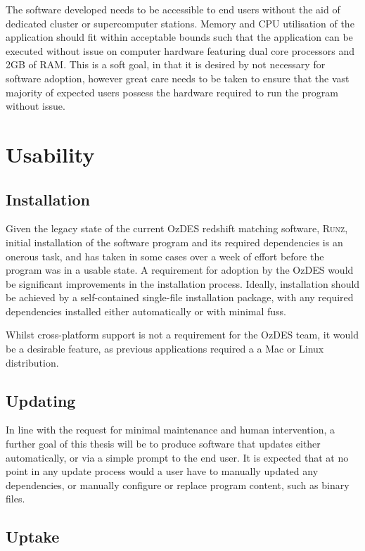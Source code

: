 \documentclass[titlesmallcaps, examinerscopy, copyrightpage]{uqthesis}
\begin{document}
The software developed needs to be accessible to end users without the aid of dedicated cluster or supercomputer stations. Memory and CPU utilisation of the application should fit within acceptable bounds such that the application can be executed without issue on computer hardware featuring dual core processors and 2GB of RAM. This is a soft goal, in that it is desired by not necessary for software adoption, however great care needs to be taken to ensure that the vast majority of expected users possess the hardware required to run the program without issue.

\section{Usability}

\subsection{Installation}

Given the legacy state of the current OzDES redshift matching software, \textsc{Runz}, initial installation of the software program and its required dependencies is an onerous task, and has taken in some cases over a week of effort before the program was in a usable state. A requirement for adoption by the OzDES would be significant improvements in the installation process. Ideally, installation should be achieved by a self-contained  single-file installation package, with any required dependencies installed either automatically or with minimal fuss.

Whilst cross-platform support is not a requirement for the OzDES team, it would be a desirable feature, as previous applications required a a Mac or Linux distribution.

\subsection{Updating}

In line with the request for minimal maintenance and human intervention, a further goal of this thesis will be to produce software that updates either automatically, or via a simple prompt to the end user. It is expected that at no point in any update process would a user have to manually updated any dependencies, or manually configure or replace program content, such as binary files.

\subsection{Uptake}
\end{document}
